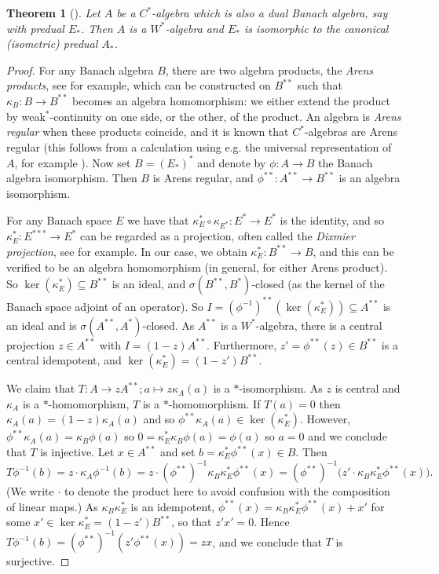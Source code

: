 \documentclass[a4paper,11pt]{article}
\theoremstyle{plain}
\newtheorem{theorem}[proposition]{Theorem}
\theoremstyle{remark}
\begin{document}
\begin{theorem}[{\cite[Corollary~2.6]{pham_vn_algs}}]\label{thm:cstar_dba}
Let $A$ be a $C^*$-algebra which is also a dual Banach algebra, say with predual $E_*$.  Then $A$ is a $W^*$-algebra and $E_*$ is isomorphic to the canonical (isometric) predual $A_*$.
\end{theorem}
\begin{proof}
For any Banach algebra $B$, there are two algebra products, the \emph{Arens products}, see \cite[Section~1.4]{Palmer_Book1} for example, which can be constructed on $B^{**}$ such that $\kappa_B \colon B \to B^{**}$ becomes an algebra homomorphism: we either extend the product by weak$^*$-continuity on one side, or the other, of the product.  An algebra is \emph{Arens regular} when these products coincide, and it is known that $C^*$-algebras are Arens regular (this follows from a calculation using e.g. the universal representation of $A$, for example \cite[Lemma~3]{palmer_arens_mult_Wstar}).  Now set $B = (E_*)^*$ and denote by $\phi \colon A\to B$ the Banach algebra isomorphism.  Then $B$ is Arens regular, and $\phi^{**} \colon A^{**} \to B^{**}$ is an algebra isomorphism.

For any Banach space $E$ we have that $\kappa_E^* \circ \kappa_{E^*} \colon E^* \to E^*$ is the identity, and so $\kappa_E^* \colon E^{***} \to E^*$ can be regarded as a projection, often called the \emph{Dixmier projection}, see \cite[Proposition~1.2]{Runde_DBA} for example.  In our case, we obtain $\kappa_E^* \colon B^{**} \to B$, and this can be verified to be an algebra homomorphism (in general, for either Arens product).  So $\ker(\kappa_E^*) \subseteq B^{**}$ is an ideal, and $\sigma(B^{**}, B^*)$-closed (as the kernel of the Banach space adjoint of an operator).  So $I = (\phi^{-1})^{**}(\ker(\kappa_E^*)) \subseteq A^{**}$ is an ideal and is $\sigma(A^{**}, A^*)$-closed.  As $A^{**}$ is a $W^*$-algebra, there is a central projection $z\in A^{**}$ with $I = (1-z)A^{**}$.  Furthermore, $z' = \phi^{**}(z) \in B^{**}$ is a central idempotent, and $\ker(\kappa_E^*) = (1-z') B^{**}$.

We claim that $T \colon A \to zA^{**}; a\mapsto z\kappa_A(a)$ is a $*$-isomorphism.  As $z$ is central and $\kappa_A$ is a $*$-homomorphism, $T$ is a $*$-homomorphism.  If $T(a)=0$ then $\kappa_A(a) = (1-z)\kappa_A(a)$ and so $\phi^{**}\kappa_A(a) \in \ker(\kappa_E^*)$.  However, $\phi^{**}\kappa_A(a) = \kappa_B\phi(a)$ so $0 = \kappa_E^* \kappa_B\phi(a) = \phi(a)$ so $a=0$ and we conclude that $T$ is injective.  Let $x\in A^{**}$ and set $b = \kappa_E^*\phi^{**}(x) \in B$.  Then
\[ T\phi^{-1}(b) = z \cdot \kappa_A\phi^{-1}(b)
= z\cdot (\phi^{**})^{-1}\kappa_B \kappa_E^*\phi^{**}(x)
= (\phi^{**})^{-1}\bigl( z'\cdot \kappa_B \kappa_E^*\phi^{**}(x) \bigr). \]
(We write $\cdot$ to denote the product here to avoid confusion with the composition of linear maps.)
As $\kappa_B \kappa_E^*$ is an idempotent, $\phi^{**}(x) = \kappa_B \kappa_E^*\phi^{**}(x) + x'$ for some $x' \in \ker\kappa_E^* = (1-z')B^{**}$, so that $z'x'=0$.  Hence $T\phi^{-1}(b) = (\phi^{**})^{-1}(z' \phi^{**}(x)) = z x$, and we conclude that $T$ is surjective.


\end{proof}
\end{document}
